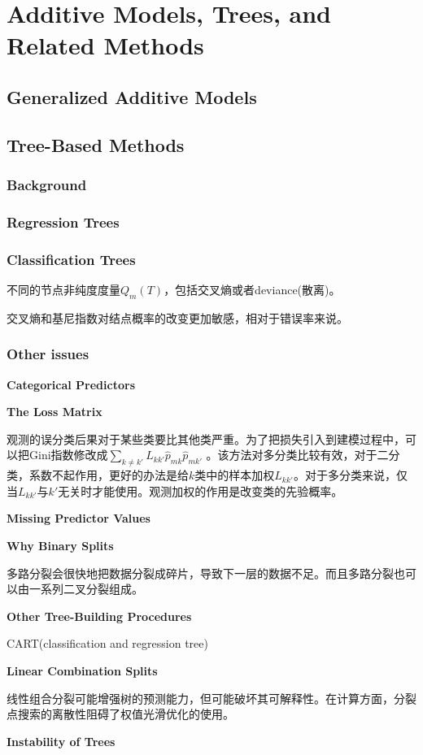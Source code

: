 \chapter{Additive Models, Trees, and Related Methods}
    \section{Generalized Additive Models}
    \section{Tree-Based Methods}
        \subsection{Background}
        \subsection{Regression Trees}
        \subsection{Classification Trees}
            不同的节点非纯度度量${Q_m}(T)$，包括交叉熵或者deviance(散离)。

            交叉熵和基尼指数对结点概率的改变更加敏感，相对于错误率来说。
        \subsection{Other issues}
            {\color{blue} \bf{Categorical Predictors}}

            {\color{blue} \bf{The Loss Matrix}}

            观测的误分类后果对于某些类要比其他类严重。为了把损失引入到建模过程中，可以把Gini指数修改成$\sum\nolimits_{k \ne k'} {{L_{kk'}}} {\hat p_{mk}}{\hat p_{mk'}}$ 。该方法对多分类比较有效，对于二分类，系数不起作用，更好的办法是给$k$类中的样本加权$L_{kk'}$。对于多分类来说，仅当$L_{kk'}$与$k'$无关时才能使用。观测加权的作用是改变类的先验概率。
            
            {\color{blue} \bf{Missing Predictor Values}}
            
            {\color{blue} \bf{Why Binary Splits}}
            
            多路分裂会很快地把数据分裂成碎片，导致下一层的数据不足。而且多路分裂也可以由一系列二叉分裂组成。
            
            {\color{blue} \bf{Other Tree-Building Procedures}}
            
            CART(classification and regression tree)
            
            {\color{blue} \bf{Linear Combination Splits}}
            
            线性组合分裂可能增强树的预测能力，但可能破坏其可解释性。在计算方面，分裂点搜索的离散性阻碍了权值光滑优化的使用。
            
            {\color{blue} \bf{Instability of Trees}}
